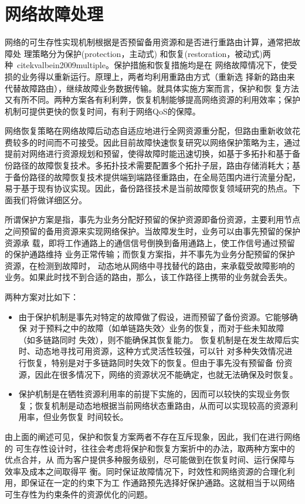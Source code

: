 \section{网络故障处理}
网络的可生存性实现机制根据是否预留备用资源和是否进行重路由计算，通常把故障处 理策略分为保护(protection，主动式) 和恢复(restoration，被动式)两种\ cite{kvalbein2009multiple}。保护措施和恢复措施均是在 网络故障情况下，使受损的业务得以重新运行。原理上，两者均利用重路由方式（重新选 择新的路由来代替故障路由），继续故障业务数据传输。就具体实施方案而言，保护和恢 复方法又有所不同。两种方案各有利利弊，恢复机制能够提高网络资源的利用效率；保护机制可提供更快的恢复时间，有利于网络QoS的保障。

网络恢复策略在网络故障后动态自适应地进行全网资源重分配，但路由重新收敛花费较多的时间而不可接受。因此目前故障快速恢复研究以网络保护策略为主，通过提前对网络进行资源规划和预留，使得故障时能迅速切换，如基于多拓扑\cite{shand2010ip}和基于备份路径的故障恢复技术。多拓扑技术需要配置多个拓扑子层，路由存储消耗大；基于备份路径的故障恢复技术提供端到端路径重路由，在全局范围内进行流量分配，易于基于现有协议实现。因此，备份路径技术是当前故障恢复领域研究的热点\cite{yang2014keep,suchara2011network,banner2010designing}。下面我们将做详细区分。

所谓保护方案是指，事先为业务分配好预留的保护资源即备份资源，主要利用节点 之间预留的备用资源来实现网络保护。当故障发生时，业务可以由事先预留的保护资源承 载，即将工作通路上的通信信号倒换到备用通路上，使工作信号通过预留的保护通路维持 业务正常传输；而恢复方案指，并不事先为业务分配预留的保护资源，在检测到故障时， 动态地从网络中寻找替代的路由，来承载受故障影响的业务。如果此时找不到合适的路由，那么，该工作路径上携带的业务就会丢失。

两种方案对比如下：
\begin{itemize}
  \item 由于保护机制是事先对特定的故障做了假设，进而预留了备份资源。它能够确保 对于预料之中的故障（如单链路失效〉业务的恢复，而对于些未知故障（如多链路同时 失效），则不能确保其恢复能力。
恢复机制是在发生故障后实时、动态地寻找可用资源，这种方式灵活性较强，可以针 对多种失效情况进行恢复，特别是对于多链路同时失效下的恢复。但由于事先没有预留备 份资源，因此在很多情况下，网络的资源状况不能确定，也就无法确保及时恢复。
  \item 保护机制是在牺牲资源利用率的前提下实施的，因而可以较快的实现业务恢复；恢复机制是动态地根据当前网络状态重路由，从而可以实现较高的资源利用率，但业务恢复 时间较长。
\end{itemize}
由上面的阐述可见，保护和恢复方案两者不存在互斥现象，因此，我们在进行网络的 可生存性设计时，往往会考虑将保护和恢复方案折中的办法，取两种方案中的优点合并，从 而为客户提供多种服务级别，尽可能做到在恢复时间、运行保障与效率及成本之间取得平 衡。同时保证故障情况下，时效性和网络资源的合理化利用，即保证在一定的约束下为工 作通路预先选择好保护通路。这就相当于以网络可生存性为约束条件的资源优化的问题。

